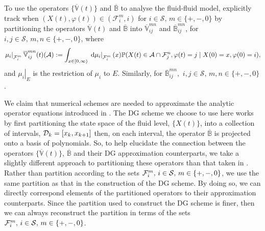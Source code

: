 To use the operators \(\{ \overline{\mathbb  V}(t)\}\) and \( \overline{\mathbb  B}\) to analyse the fluid-fluid model, \cite{bo2014} explicitly track when \((X(t),\varphi(t))\in(\mathcal F_i^m,i)\) for \(i\in\mathcal S,\, m \in \{+,-,0\}\) by partitioning the operators \( \overline{\mathbb  V}(t)\) and \( \overline{\mathbb  B}\) into \( \overline{\mathbb  V}_{ij}^{m n}\) and \( \overline{\mathbb  B}_{ij}^{m n}\), for \(i,j\in\mathcal S,\, m,n\in \{+,-,0\}\), where
\[\left.\mu_i\right|_{\mathcal{F}_i^m}  \overline{\mathbb  V}_{ij}^{m n}(t)(\mathcal A) := \int_{x\in[0,\infty)} \left. \, \mathrm{d} \mu_i\right|_{\mathcal{F}_i^m}(x)\mathbb P (X(t) \in\mathcal A\cap \mathcal{F}_j^n,\varphi(t) = j \mid X(0) = x, \varphi(0) = i),\]
and \(\left.\mu_i\right|_{E}\) is the restriction of \(\mu_i\) to \(E\). Similarly, for \( \overline{\mathbb  B}_{ij}^{m n},\) \(i,j\in\mathcal S,\, m,n\in \{+,-,0\}\).

We claim that numerical schemes are needed to approximate the analytic operator equations introduced in \cite{bo2014}. The DG scheme we choose to use here works by first partitioning the state space of the fluid level, \(\{X(t)\}\), into a collection of intervals, \(\mathcal{D}_k=[x_k,x_{k+1}]\) then, on each interval, the operator \(\overline{\mathbb B}\) is projected onto a basis of polynomials. So, to help elucidate the connection between the operators \(\{ \overline{\mathbb  V}(t)\}\), \( \overline{\mathbb  B}\) and their DG approximation counterparts, we take a slightly different approach to partitioning these operators than that taken in \cite{bo2014}. Rather than partition according to the sets \(\mathcal{F}_i^m,\,i\in\mathcal{S},\,m\in\{+,-,0\}\), we use the same partition as that in the construction of the DG scheme. By doing so, we can directly correspond elements of the partitioned operators to their approximation counterparts. Since the partition used to construct the DG scheme is finer, then we can always reconstruct the partition in terms of the sets \(\mathcal{F}_i^m,\,i\in\mathcal{S},\,m\in\{+,-,0\}\). 

